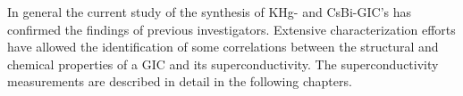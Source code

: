         In  general  the current  study   of  the synthesis  of  KHg-   and
CsBi-GIC's     has       confirmed      the     findings     of    previous
investigators.\cite{lagrange87,J140,yang84}   Extensive    characterization
efforts  have  allowed the identification of  some correlations between the
structural and chemical properties of a GIC and its superconductivity.  The
superconductivity measurements are   described  in detail in the  following
chapters.
